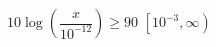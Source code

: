 {$10\log\left(\dfrac{x}{10^{-12}}\right) \geq 90$ \label{sixfourdecibelineq} }
{$\left[10^{-3}, \infty \right)$}